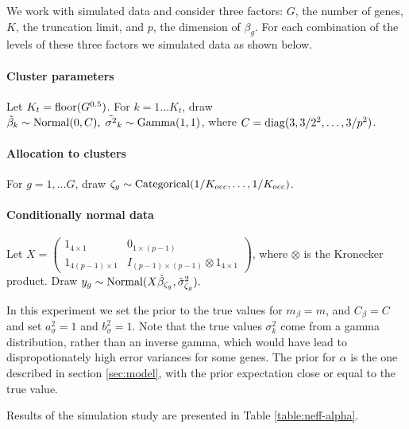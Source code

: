 We work with simulated data and consider three factors: $G$, the number of genes, $K$, the truncation limit, and $p$, the dimension of $\beta_g$. For each combination of the levels of these three factors we simulated data as shown below.

\paragraph{Cluster parameters}
Let $K_{t} = \operatorname{floor}(G^{0.5})$. For $k=1 \ldots K_{t}$, draw $\tilde{\beta}_k \sim \operatorname{Normal}(0, C),\; \tilde{\sigma^2}_k \sim \operatorname{Gamma}(1, 1)$, where $C=\operatorname{diag}(3, 3/2^2, \ldots, 3/p^2)$.
  
\paragraph{Allocation to clusters} For $g=1,\ldots G$, draw $\zeta_g \sim \operatorname{Categorical}(1/K_{occ},\ldots,1/K_{occ})$. 
  
\paragraph{Conditionally normal data}
 Let $X = \begin{pmatrix} 1_{4 \times 1} & 0_{1\times(p-1)}\\
                                 1_{4(p-1) \times 1} & I_{(p-1)\times(p-1)} \otimes 1_{4\times 1} \end{pmatrix}$, where $\otimes$ is the Kronecker product. Draw $y_{g} \sim \operatorname{Normal}(X\tilde{\beta}_{\zeta_g}, \tilde{\sigma}^2_{\zeta_g}).$


In this experiment we set the prior to the true values for $m_\beta = m$, and $C_\beta = C$ and set $a_\sigma^2=1$ and $b_\sigma^2=1$. Note that the true values $\sigma^2_k$ come from a gamma distribution, rather than an inverse gamma, which would have lead to dispropotionately high error variances for some genes. The prior for $\alpha$ is the one described in section \ref{sec:model}, with the prior expectation close or equal to the true value.

Results of the simulation study are presented in Table \ref{table:neff-alpha}.

